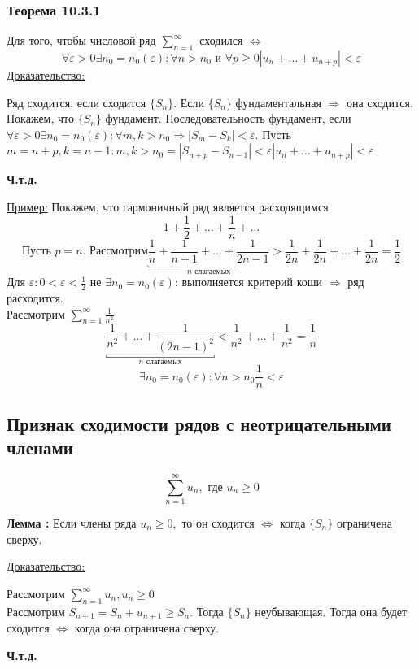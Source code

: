 \documentclass[12pt]{article}
\let\oldsum\sum
\renewcommand{\sum}{\oldsum\limits}
\begin{document}
  \subsubsection*{Теорема 10.3.1}\label{th:10.3.1}
  \par\noindent
  Для того, чтобы числовой ряд $\sum_{n=1}^{\infty}$ сходился $\Leftrightarrow$
  \[\forall \varepsilon > 0 \exists n_0=n_0(\varepsilon):\forall n>n_0 \text{ и } \forall p \geq 0 |u_n+\dots+u_{n+p}|<\varepsilon\]
  \underline{Доказательство:}
  \begin{adjustwidth}{1.5em}{1.5em}
    Ряд сходится, если сходится $\{S_n\}$. Если $\{S_n\}$ фундаментальная $\Rightarrow$ она сходится.
    Покажем, что $\{S_n\}$ фундамент. Последовательность фундамент, если $\forall \varepsilon >0 \exists
    n_0=n_0(\varepsilon):\forall m,k>n_0 \Rightarrow |S_m-S_k|<\varepsilon$. Пусть $m=n+p,k=n-1:m,k>n_0=
    |S_{n+p}-S_{n-1}|<\varepsilon |u_n+\dots+u_{n+p}|<\varepsilon$
  \end{adjustwidth}
  \begin{center}
    \textbf{Ч.т.д.}
  \end{center}

  \underline{Пример:} Покажем, что гармоничный ряд является расходящимся\\
  \[1+\frac{1}{2}+\dots+\frac{1}{n}+\dots\]
  \[\text{Пусть } p=n. 
  \text{ Рассмотрим} 
  \underbracket{\frac{1}{n}+\frac{1}{n+1}+\dots+\frac{1}{2n-1}}_{n \text{ слагаемых}}>
  \frac{1}{2n}+\frac{1}{2n}+\dots+\frac{1}{2n}=\frac{1}{2}\]
  Для $\varepsilon:0<\varepsilon<\frac{1}{2}$ не $\exists n_0=n_0(\varepsilon)$: выполняется критерий коши 
  $\Rightarrow$ ряд расходится.\\
  Рассмотрим $\sum_{n=1}^{\infty}\frac{1}{n^2}$\\
  \[\underbracket{\frac{1}{n^2}+\dots+\frac{1}{(2n-1)^2}}_{n\text{ слагаемых}}
  <\frac{1}{n^2}+\dots+\frac{1}{n^2}=\frac{1}{n}\]
  \[\exists n_0=n_0(\varepsilon):\forall n>n_0 \frac{1}{n}<\varepsilon\]

  \subsection{Признак сходимости рядов с неотрицательными членами}
  \[\sum_{n=1}^{\infty} u_n, \text{ где } u_n\geq 0\]
  
  \textbf{Лемма :} Если члены ряда $u_n \geq 0,$ то он сходится $\Leftrightarrow$ когда $\{S_n\}$ ограничена сверху.

  \underline{Доказательство:}
  \begin{adjustwidth}{1.5em}{1.5em}
    Рассмотрим $\sum_{n=1}^{\infty} u_n, u_n \geq 0$\\
    Рассмотрим $S_{n+1}=S_n+u_{n+1}\geq S_n.$ Тогда $\{S_n\}$ неубывающая. Тогда она будет сходится $\Leftrightarrow$ когда она ограничена сверху.
  \end{adjustwidth}
  \begin{center}
    \textbf{Ч.т.д.}
  \end{center}
\end{document}
